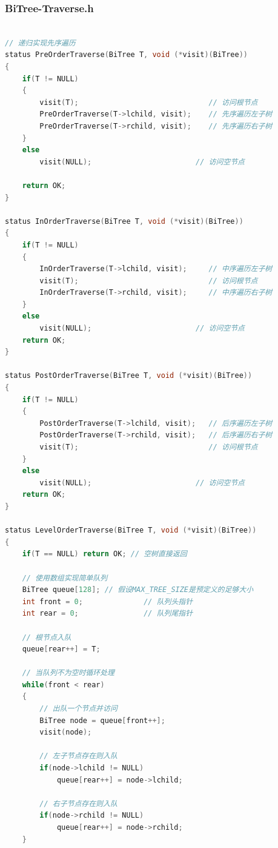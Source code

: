 \documentclass[supercite]{Experimental_Report}
\theoremstyle{definition}
\begin{document}
\subsubsection*{BiTree-Traverse.h}
\begin{lstlisting}[language=C, caption={BiTree-Traverse.h}, label=lst:bi_tree_traverse_h]

// 递归实现先序遍历
status PreOrderTraverse(BiTree T, void (*visit)(BiTree))
{
    if(T != NULL)
    {
        visit(T);                              // 访问根节点
        PreOrderTraverse(T->lchild, visit);    // 先序遍历左子树
        PreOrderTraverse(T->rchild, visit);    // 先序遍历右子树
    }
    else    
        visit(NULL);                        // 访问空节点
        
    return OK;
}

status InOrderTraverse(BiTree T, void (*visit)(BiTree))
{
    if(T != NULL)
    {
        InOrderTraverse(T->lchild, visit);     // 中序遍历左子树
        visit(T);                              // 访问根节点
        InOrderTraverse(T->rchild, visit);     // 中序遍历右子树
    }
    else
        visit(NULL);                        // 访问空节点
    return OK;
}

status PostOrderTraverse(BiTree T, void (*visit)(BiTree))
{
    if(T != NULL)
    {
        PostOrderTraverse(T->lchild, visit);   // 后序遍历左子树
        PostOrderTraverse(T->rchild, visit);   // 后序遍历右子树
        visit(T);                              // 访问根节点
    }
    else
        visit(NULL);                        // 访问空节点
    return OK;
}

status LevelOrderTraverse(BiTree T, void (*visit)(BiTree))
{
    if(T == NULL) return OK; // 空树直接返回
    
    // 使用数组实现简单队列
    BiTree queue[128]; // 假设MAX_TREE_SIZE是预定义的足够大小
    int front = 0;              // 队列头指针
    int rear = 0;               // 队列尾指针
    
    // 根节点入队
    queue[rear++] = T;
    
    // 当队列不为空时循环处理
    while(front < rear)
    {
        // 出队一个节点并访问
        BiTree node = queue[front++];
        visit(node);
        
        // 左子节点存在则入队
        if(node->lchild != NULL)
            queue[rear++] = node->lchild;
        
        // 右子节点存在则入队
        if(node->rchild != NULL)
            queue[rear++] = node->rchild;
    }
    

\end{lstlisting}
\end{document}
